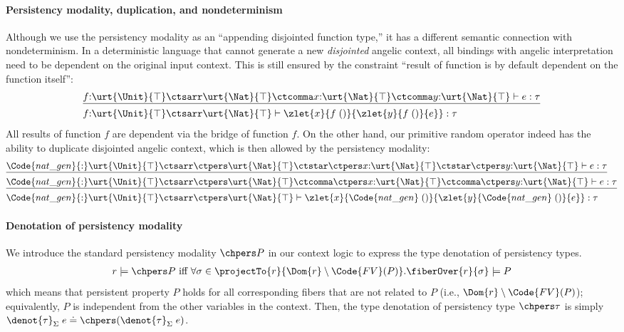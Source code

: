 \paragraph{Persistency modality, duplication, and nondeterminism} Although we use the persistency modality as an ``appending disjointed function type,'' it has a different semantic connection with nondeterminism. In a deterministic language that cannot generate a new \emph{disjointed} angelic context, all bindings with angelic interpretation need to be dependent on the original input context. This is still ensured by the constraint ``result of function is by default dependent on the function itself'':
\begin{align*}
  &\underline{f{:}\urt{\Unit}{\top}\ctsarr \urt{\Nat}{\top} \ctcomma  x{:}\urt{\Nat}{\top} \ctcomma y{:}\urt{\Nat}{\top} \vdash e : \tau}
  \\&f{:}\urt{\Unit}{\top}\ctsarr \urt{\Nat}{\top} \vdash \zlet{x}{f\;()}{\zlet{y}{f\;()}{e}} : \tau
\end{align*}\noindent
All results of function $f$ are dependent via the bridge of function $f$.
On the other hand, our primitive random operator indeed has the ability to duplicate disjointed angelic context, which is then allowed by the persistency modality:
\begin{align*}
  &\underline{\Code{nat\_gen}{:}\urt{\Unit}{\top}\ctsarr \ctpers \urt{\Nat}{\top} \ctstar \ctpers x{:}\urt{\Nat}{\top} \ctstar \ctpers y{:}\urt{\Nat}{\top} \vdash e : \tau}
  \\&\underline{\Code{nat\_gen}{:}\urt{\Unit}{\top}\ctsarr \ctpers \urt{\Nat}{\top} \ctcomma \ctpers x{:}\urt{\Nat}{\top} \ctcomma \ctpers y{:}\urt{\Nat}{\top} \vdash e : \tau}
  \\&\Code{nat\_gen}{:}\urt{\Unit}{\top}\ctsarr \ctpers \urt{\Nat}{\top} \vdash \zlet{x}{\Code{nat\_gen}\;()}{\zlet{y}{\Code{nat\_gen}\;()}{e}} : \tau
\end{align*}\noindent

\paragraph{Denotation of persistency modality} We introduce the standard persistency modality $\chpers P$ in our context logic to express the type denotation of persistency types.
\begin{align*}
  r \models \chpers P \text{ iff } \forall \sigma \in \projectTo{r}{\Dom{r} \setminus \Code{FV}(P)}. \fiberOver{r}{\sigma} \models P
\end{align*}\noindent
which means that persistent property $P$ holds for all corresponding fibers that are not related to $P$ (i.e., $\Dom{r} \setminus \Code{FV}(P)$); equivalently, $P$ is independent from the other variables in the context. Then, the type denotation of persistency type $\chpers \tau$ is simply $ \denot{\tau}_\Sigma\;e \doteq \chpers (\denot{\tau}_\Sigma\;e)$.

